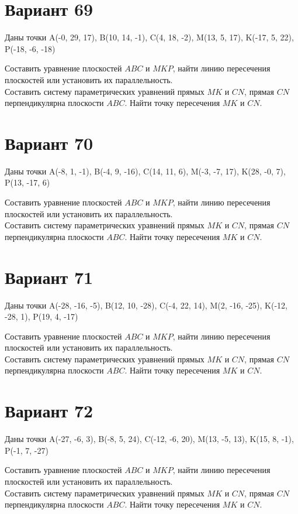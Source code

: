 \documentclass[11pt]{article}
\begin{document}
\section*{Вариант 69}
Даны точки A(-0, 29, 17), B(10, 14, -1), C(4, 18, -2), M(13, 5, 17), K(-17, 5, 22), P(-18, -6, -18)

Составить уравнение плоскостей $ABC$ и $MKP$, найти линию пересечения плоскостей или установить их параллельность.\\
Составить систему параметрических уравнений прямых $MK$ и $CN$, прямая $CN$ перпендикулярна плоскости $ABC$. Найти точку пересечения $MK$ и $CN$.

\section*{Вариант 70}
Даны точки A(-8, 1, -1), B(-4, 9, -16), C(14, 11, 6), M(-3, -7, 17), K(28, -0, 7), P(13, -17, 6)

Составить уравнение плоскостей $ABC$ и $MKP$, найти линию пересечения плоскостей или установить их параллельность.\\
Составить систему параметрических уравнений прямых $MK$ и $CN$, прямая $CN$ перпендикулярна плоскости $ABC$. Найти точку пересечения $MK$ и $CN$.

\section*{Вариант 71}
Даны точки A(-28, -16, -5), B(12, 10, -28), C(-4, 22, 14), M(2, -16, -25), K(-12, -28, 1), P(19, 4, -17)

Составить уравнение плоскостей $ABC$ и $MKP$, найти линию пересечения плоскостей или установить их параллельность.\\
Составить систему параметрических уравнений прямых $MK$ и $CN$, прямая $CN$ перпендикулярна плоскости $ABC$. Найти точку пересечения $MK$ и $CN$.

\section*{Вариант 72}
Даны точки A(-27, -6, 3), B(-8, 5, 24), C(-12, -6, 20), M(13, -5, 13), K(15, 8, -1), P(-1, 7, -27)

Составить уравнение плоскостей $ABC$ и $MKP$, найти линию пересечения плоскостей или установить их параллельность.\\
Составить систему параметрических уравнений прямых $MK$ и $CN$, прямая $CN$ перпендикулярна плоскости $ABC$. Найти точку пересечения $MK$ и $CN$.
\end{document}
